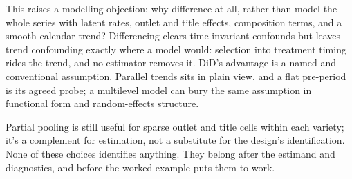 This raises a modelling objection: why difference at all, rather than model the whole series with latent rates, outlet and title effects, composition terms, and a smooth calendar trend? Differencing clears time-invariant confounds but leaves trend confounding exactly where a model would: selection into treatment timing rides the trend, and no estimator removes it. DiD's advantage is a named and conventional assumption. Parallel trends sits in plain view, and a flat pre-period is its agreed probe; a multilevel model can bury the same assumption in functional form and random-effects structure.

Partial pooling is still useful for sparse outlet and title cells within each variety; it's a complement for estimation, not a substitute for the design's identification. None of these choices identifies anything. They belong after the estimand and diagnostics, and before the worked example puts them to work.
